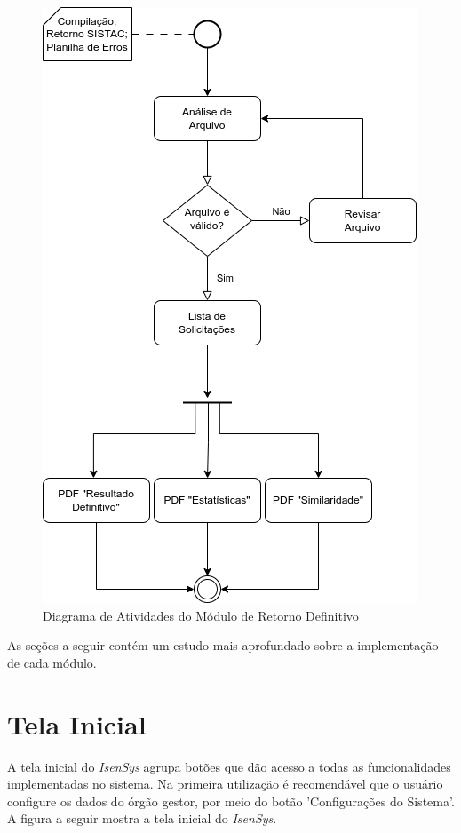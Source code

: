 \documentclass[
	12pt,			%
	openright,		%
	oneside,	
	a4paper,		%
	english,		%
	brazil			%
]{abntex2/abntex2}  %
\begin{document}
		\clearpage
		\begin{figure}[!ht]
			\begin{center}
				
				\caption{Diagrama de Atividades do Módulo de Retorno Definitivo}
				\includegraphics[scale=0.85]{img/diagrama-ativs-definitivo}
				
			\end{center}
		\end{figure}
		
		As seções a seguir contém um estudo mais aprofundado sobre a implementação de cada módulo.

		\section{Tela Inicial}
		
			A tela inicial do \textit{IsenSys} agrupa botões que dão acesso a todas as funcionalidades implementadas no sistema. Na primeira utilização é recomendável que o usuário configure os dados do órgão gestor, por meio do botão 'Configurações do Sistema'. A figura a seguir mostra a tela inicial do \textit{IsenSys}.
			
\end{document}
